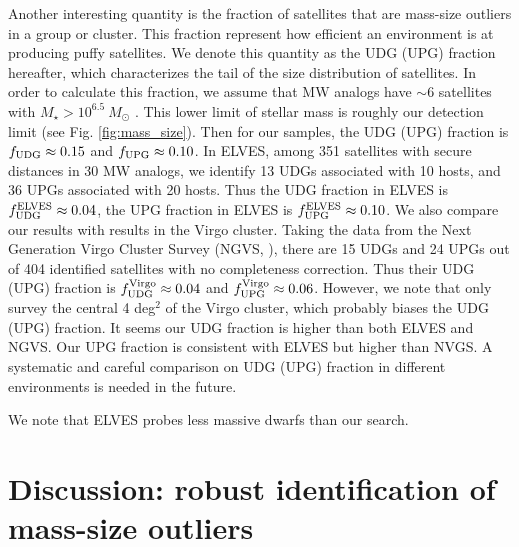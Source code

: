 \documentclass[twocolumn,astrosymb,twocolappendix]{aastex631}
\begin{document}
\begin{CJK*}{UTF8}{gbsn}
Another interesting quantity is the fraction of satellites that are mass-size outliers in a group or cluster. This fraction represent how efficient an environment is at producing puffy satellites. We denote this quantity as the UDG (UPG) fraction hereafter, which characterizes the tail of the size distribution of satellites. In order to calculate this fraction, we assume that MW analogs have $\sim 6$ satellites with $M_\star > 10^{6.5}\ M_\odot$ \citep{CarlstenELVES2022}. This lower limit of stellar mass is roughly our detection limit (see Fig. \ref{fig:mass_size}). Then for our samples, the UDG (UPG) fraction is $f_{\rm UDG} \approx 0.15$ and $f_{\rm UPG} \approx 0.10$. In ELVES, among 351 satellites with secure distances in 30 MW analogs, we identify 13 UDGs associated with 10 hosts, and 36 UPGs associated with 20 hosts. Thus the UDG fraction in ELVES is $f_{\rm UDG}^{\rm ELVES} \approx 0.04$, the UPG fraction in ELVES is $f_{\rm UPG}^{\rm ELVES} \approx 0.10$. We also compare our results with results in the Virgo cluster. Taking the data from the Next Generation Virgo Cluster Survey (NGVS, \citealt{Ferrarese2020}), there are 15 UDGs and 24 UPGs out of 404 identified satellites with no completeness correction. Thus their UDG (UPG) fraction is $f_{\rm UDG}^{\rm Virgo} \approx 0.04$ and $f_{\rm UPG}^{\rm Virgo} \approx 0.06$. However, we note that \citet{Ferrarese2020} only survey the central 4 deg$^2$ of the Virgo cluster, which probably biases the UDG (UPG) fraction. It seems our UDG fraction is higher than both ELVES and NGVS. Our UPG fraction is consistent with ELVES but higher than NVGS. A systematic and careful comparison on UDG (UPG) fraction in different environments is needed in the future. 

We note that ELVES probes less massive dwarfs than our search. 

\section{Discussion: robust identification of mass-size outliers}\label{sec:discussion}




\end{CJK*}
\end{document}
